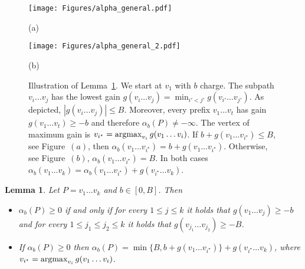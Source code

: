\documentclass[11pt]{article}
\newtheorem{lemma}[theorem]{Lemma}
\newcommand{\argmax}{\operatornamewithlimits{argmax}}
\begin{document}
\begin{figure}
    \centering
\texttt{[image: Figures/alpha\_general.pdf]}
    \par\smallskip (a)
    
    \vspace{0.5cm} 

\texttt{[image: Figures/alpha\_general\_2.pdf]}
    \par\smallskip (b)
\caption{Illustration of Lemma~\ref{lem:alpha_general}. We start at $v_1$ with $b$ charge. The subpath $v_i\ldots v_j$ has the lowest gain $g(v_i\ldots v_j) = \min_{i'<j'} g(v_{i'}\ldots v_{j'})$. As depicted, $|g(v_i\ldots v_j)|\le B$. Moreover, every prefix $v_1\ldots v_t$ has gain $g(v_1\ldots v_t)\ge -b$ and therefore $
\alpha_b(P)\neq -\infty$. The vertex of maximum gain is $v_{i^\star} = \argmax_{v_i} g(v_1\ldots v_i)$. If $b+g(v_1\ldots v_{i^\star})\le B$, see Figure~$(a)$, then $\alpha_b(v_1\ldots v_{i^\star}) = b + g(v_1\ldots v_{i^\star})$. Otherwise, see Figure~$(b)$, $\alpha_b(v_1\ldots v_{i^\star}) = B$. In both cases $\alpha_b(v_1\ldots v_{k}) = \alpha_b(v_1\ldots v_{i^\star}) + g( v_{i^\star} \ldots v_k)$.}  
\label{fig:alpha_general}
\end{figure}

\begin{lemma}\label{lem:alpha_general}
 Let $P = v_1\ldots v_k$ and $b\in [0,B]$. Then
 \begin{itemize}
     \item $\alpha_b(P) \ge 0 $ if and only if for every $1\le j \le k$ it holds that $g(v_1\ldots v_{j})\ge -b$ and for every $1\le j_1 \le j_2 \le k$ it holds that $g(v_{j_1}\ldots v_{j_2})\ge -B$.
     \item If $\alpha_b(P) \ge 0 $ then $\alpha_b(P) =  \min \{B, b + g(v_1\ldots v_{i^\star}) \} + g(v_{i^\star} \ldots v_k)$, where $v_{i^\star} = \argmax_{v_i}g(v_1\ldots v_i)$. 
 \end{itemize}
\end{lemma}
\end{document}
